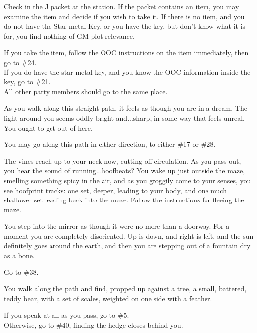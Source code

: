 \documentclass[green]{gl2018}
\begin{document}
\begin{large}
\begin{location}{39}
 Check in the J packet at the station.  If the packet contains an item, you may examine the item and decide if you wish to take it.  If there is no item, and you do not have the Star-metal Key, or you have the key, but don't know what it is for, you find nothing of GM plot relevance. 
\begin{fromhere}
If you take the item, follow the OOC instructions on the item immediately, then go to \#24.\\
If you do have the star-metal key, and you know the OOC information inside the key, go to \#21.
\\
All other party members should go to the same place.
\end{fromhere}
\end{location}
\begin{location}{40}
As you walk along this straight path, it feels as though you are in a dream.  The light around you seems oddly bright and...sharp, in some way that feels unreal.  You ought to get out of here.
\begin{fromhere}
You may go along this path in either direction, to either \#17 or \#28.
\end{fromhere}
\end{location}
\begin{location}{41}
The vines reach up to your neck now, cutting off circulation.  As you pass out, you hear the sound of running...hoofbeats?  You wake up just outside the maze, smelling something spicy in the air, and as you groggily come to your senses, you see hoofprint tracks: one set, deeper, leading to your body, and one much shallower set leading back into the maze.  Follow the instructions for fleeing the maze.
\end{location}
\begin{location}{42}
You step into the mirror as though it were no more than a doorway. For a moment you are completely disoriented. Up is down, and right is left, and the sun definitely goes around the earth, and then you are stepping out of a fountain dry as a bone.

\begin{fromhere}
Go to \#38.\\

\end{fromhere}
\end{location}
\begin{location}{43}
You walk along the path and find, propped up against a tree, a small, battered, teddy bear, with a set of scales, weighted on one side with a feather.
\begin{fromhere}
If you speak at all as you pass, go to \#5.\\
Otherwise, go to \#40, finding the hedge closes behind you.
\end{fromhere}
\end{location}
\begin{location}{44}


\end{location}
\end{large}
\end{document}
